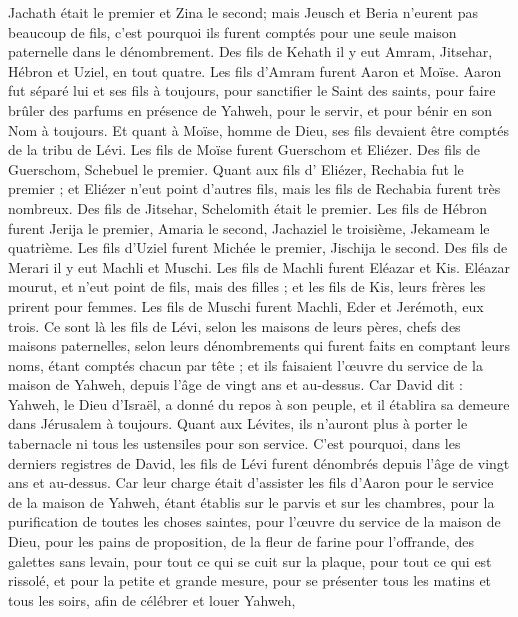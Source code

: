 \begin{multicols}{2}
Jachath était le premier et Zina le second; mais Jeusch et Beria n'eurent pas beaucoup de fils, c'est pourquoi ils furent comptés pour une seule maison paternelle dans le dénombrement.
Des fils de Kehath il y eut Amram, Jitsehar, Hébron et Uziel, en tout quatre.
Les fils d’Amram furent Aaron et Moïse. Aaron fut séparé lui et ses fils à toujours, pour sanctifier le Saint des saints, pour faire brûler des parfums en présence de Yahweh, pour le servir, et pour bénir en son Nom à toujours.
Et quant à Moïse, homme de Dieu, ses fils devaient être comptés de la tribu de Lévi.
Les fils de Moïse furent Guerschom et Eliézer.
Des fils de Guerschom, Schebuel le premier.
Quant aux fils d' Eliézer, Rechabia fut le premier ; et Eliézer n'eut point d'autres fils, mais les fils de Rechabia furent très nombreux.
Des fils de Jitsehar, Schelomith était le premier.
Les fils de Hébron furent Jerija le premier, Amaria le second, Jachaziel le troisième, Jekameam le quatrième.
Les fils d’Uziel furent Michée le premier, Jischija le second.
Des fils de Merari il y eut Machli et Muschi. Les fils de Machli furent Eléazar et Kis.
Eléazar mourut, et n'eut point de fils, mais des filles ; et les fils de Kis, leurs frères les prirent pour femmes.
Les fils de Muschi furent Machli, Eder et Jerémoth, eux trois.
Ce sont là les fils de Lévi, selon les maisons de leurs pères, chefs des maisons paternelles, selon leurs dénombrements qui furent faits en comptant leurs noms, étant comptés chacun par tête ; et ils faisaient l’œuvre du service de la maison de Yahweh, depuis l'âge de vingt ans et au-dessus.
Car David dit : Yahweh, le Dieu d'Israël, a donné du repos à son peuple, et il établira sa demeure dans Jérusalem  à toujours.
Quant aux Lévites, ils n'auront plus à porter le tabernacle ni tous les ustensiles pour son service.
C'est pourquoi, dans les derniers registres de David, les fils de Lévi furent dénombrés depuis l'âge de vingt ans et au-dessus.
Car leur charge était d'assister les fils d'Aaron pour le service de la maison de Yahweh, étant établis sur le parvis et sur les chambres, pour la purification de toutes les choses saintes, pour l'œuvre du service de la maison de Dieu,
pour les pains de proposition, de la fleur de farine pour l'offrande, des galettes sans levain, pour tout ce qui se cuit sur la plaque, pour tout ce qui est rissolé, et pour la petite et grande mesure,
pour se présenter tous les matins et tous les soirs, afin de célébrer et louer Yahweh,

\end{multicols}
